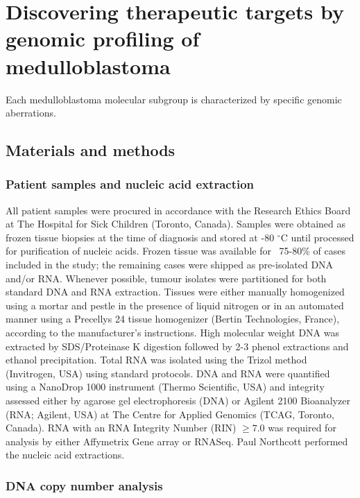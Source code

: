 \chapter{Discovering therapeutic targets by genomic profiling of medulloblastoma}
\label{ch:target-id}

\begin{hypothesis}
Each medulloblastoma molecular subgroup is characterized by specific genomic aberrations.
\end{hypothesis}

\section{Materials and methods}

\subsection{Patient samples and nucleic acid extraction}

All patient samples were procured in accordance with the Research Ethics Board at The Hospital for Sick Children (Toronto, Canada).  Samples were obtained as frozen tissue biopsies at the time of diagnosis and stored at -80 $^{\circ}$C until processed for purification of nucleic acids.  Frozen tissue was available for ~75-80\% of cases included in the study; the remaining cases were shipped as pre-isolated DNA and/or RNA.
Whenever possible, tumour isolates were partitioned for both standard DNA and RNA extraction.  Tissues were either manually homogenized using a mortar and pestle in the presence of liquid nitrogen or in an automated manner using a Precellys 24 tissue homogenizer (Bertin Technologies, France), according to the manufacturer’s instructions.  High molecular weight DNA was extracted by SDS/Proteinase K digestion followed by 2-3 phenol extractions and ethanol precipitation.  Total RNA was isolated using the Trizol method (Invitrogen, USA) using standard protocols.  DNA and RNA were quantified using a NanoDrop 1000 instrument (Thermo Scientific, USA) and integrity assessed either by agarose gel electrophoresis (DNA) or Agilent 2100 Bioanalyzer (RNA; Agilent, USA) at The Centre for Applied Genomics (TCAG, Toronto, Canada).  RNA with an RNA Integrity Number (RIN) $\ge 7.0$ was required for analysis by either Affymetrix Gene array or RNASeq. Paul Northcott performed the nucleic acid extractions.

\subsection{DNA copy number analysis}

